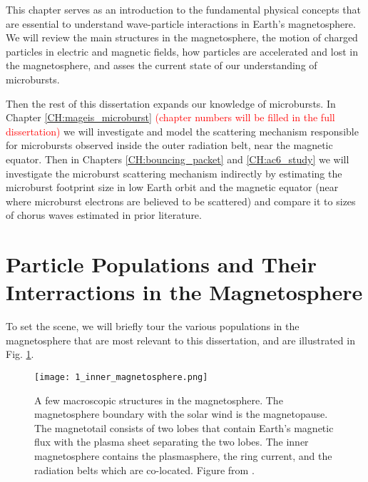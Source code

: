 This chapter serves as an introduction to the fundamental physical concepts that are essential to understand wave-particle interactions in Earth's magnetosphere. We will review the main structures in the magnetosphere, the motion of charged particles in electric and magnetic fields, how particles are accelerated and lost in the magnetosphere, and asses the current state of our understanding of microbursts.

Then the rest of this dissertation expands our knowledge of microbursts. In Chapter \ref{CH:mageis_microburst} \textcolor{red}{(chapter numbers will be filled in the full dissertation)} we will investigate and model the scattering mechanism responsible for microbursts observed inside the outer radiation belt, near the magnetic equator. Then in Chapters \ref{CH:bouncing_packet} and \ref{CH:ac6_study} we will investigate the microburst scattering mechanism indirectly by estimating the microburst footprint size in low Earth orbit and the magnetic equator (near where microburst electrons are believed to be scattered) and compare it to sizes of chorus waves estimated in prior literature.

\section{Particle Populations and Their Interractions in the Magnetosphere}\label{ntro:particle_populations}
To set the scene, we will briefly tour the various populations in the magnetosphere that are most relevant to this dissertation, and are illustrated in Fig. \ref{Intro:inner_magnetosphere}.

\begin{figure}
\texttt{[image: 1\_inner\_magnetosphere.png]}
\caption{A few macroscopic structures in the magnetosphere. The magnetosphere boundary with the solar wind is the magnetopause. The magnetotail consists of two lobes that contain Earth's magnetic flux with the plasma sheet separating the two lobes. The inner magnetosphere contains the plasmasphere, the ring current, and the radiation belts which are co-located. Figure from \citet{Baumjohann1997}.}
\label{Intro:inner_magnetosphere}
\end{figure}

